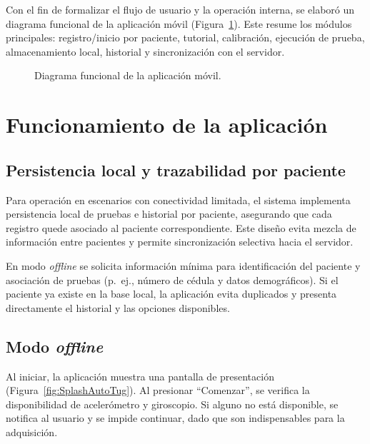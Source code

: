 \documentclass[12pt]{report}
\begin{document}
\begin{justify}
    Con el fin de formalizar el flujo de usuario y la operación interna, se elaboró un diagrama funcional de la aplicación móvil (Figura~\ref{fig:diagramaFuncionalMovil}). Este resume los módulos principales: registro/inicio por paciente, tutorial, calibración, ejecución de prueba, almacenamiento local, historial y sincronización con el servidor.

    \begin{figure}[h!]
        \centering
        
        \caption{Diagrama funcional de la aplicación móvil.}
        \label{fig:diagramaFuncionalMovil}
    \end{figure}

    \section{Funcionamiento de la aplicación}
    \label{sec:funcionamiento-app}

    \subsection{Persistencia local y trazabilidad por paciente}
    \label{subsec:gestion-local}

    Para operación en escenarios con conectividad limitada, el sistema implementa persistencia local de pruebas e historial por paciente, asegurando que cada registro quede asociado al paciente correspondiente. Este diseño evita mezcla de información entre pacientes y permite sincronización selectiva hacia el servidor.

    En modo \textit{offline} se solicita información mínima para identificación del paciente y asociación de pruebas (p.\ ej., número de cédula y datos demográficos). Si el paciente ya existe en la base local, la aplicación evita duplicados y presenta directamente el historial y las opciones disponibles.

    \subsection{Modo \textit{offline}}
    \label{subsec:offline}

    Al iniciar, la aplicación muestra una pantalla de presentación (Figura~\ref{fig:SplashAutoTug}). Al presionar ``Comenzar'', se verifica la disponibilidad de acelerómetro y giroscopio. Si alguno no está disponible, se notifica al usuario y se impide continuar, dado que son indispensables para la adquisición.\\


\end{justify}
\end{document}

